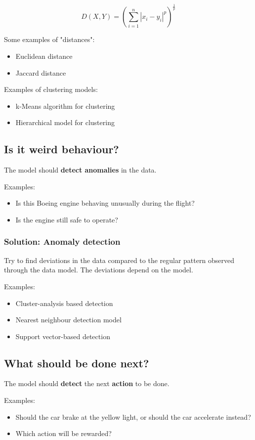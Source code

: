 \documentclass[11pt]{article}
\begin{document}
\[D(X, Y) = \left(\sum_{i = 1}^n \left| x_i - y_i \right|^p \right)^{\frac{1}{p}}\]

Some examples of "distances":
\begin{itemize}
\item Euclidean distance
\item Jaccard distance
\end{itemize}

Examples of clustering models:
\begin{itemize}
\item k-Means algorithm for clustering
\item Hierarchical model for clustering
\end{itemize}
\subsection{Is it weird behaviour?}
\label{sec:org4c86c35}
The model should \textbf{detect anomalies} in the data.

Examples:
\begin{itemize}
\item Is this Boeing engine behaving unusually during the flight?
\item Is the engine still safe to operate?
\end{itemize}
\subsubsection{Solution: Anomaly detection}
\label{sec:org0be9906}
Try to find deviations in the data compared to the regular pattern observed through the data model. The deviations depend on the model.

Examples:
\begin{itemize}
\item Cluster-analysis based detection
\item Nearest neighbour detection model
\item Support vector-based detection
\end{itemize}
\subsection{What should be done next?}
\label{sec:org5523701}
The model should \textbf{detect} the next \textbf{action} to be done.

Examples:
\begin{itemize}
\item Should the car brake at the yellow light, or should the car accelerate instead?
\item Which action will be rewarded?
\end{itemize}
\end{document}
